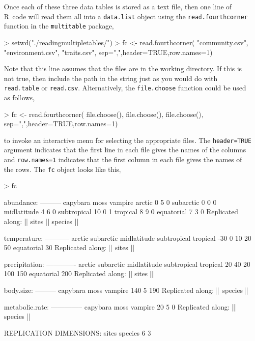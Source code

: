 \documentclass{article}
\newcommand{\R}{{\sf R}}
\newcommand{\code}[1]{\texttt{#1}}
\numberwithin{exercise}{section}
\begin{document}
Once each of these three data tables is stored as a text file, then one line of \R\ code will read them all into a \code{data.list} object using the \code{read.fourthcorner} function in the \code{multitable} package,
\begin{Schunk}
\begin{Sinput}
> setwd("./readingmultipletables/")
> fc <- read.fourthcorner(
   "community.csv",
   "environment.csv",
   "traits.csv",
   sep=",",header=TRUE,row.names=1)
\end{Sinput}
\end{Schunk}
Note that this line assumes that the files are in the working directory.  If this is not true, then include the path in the string just as you would do with \code{read.table} or \code{read.csv}.  Alternatively, the \code{file.choose} function could be used as follows,
\begin{Schunk}
\begin{Sinput}
> fc <- read.fourthcorner(
   file.choose(),
   file.choose(),
   file.choose(),
   sep=",",header=TRUE,row.names=1)
\end{Sinput}
\end{Schunk}
to invoke an interactive menu for selecting the appropriate files.  The \code{header=TRUE} argument indicates that the first line in each file gives the names of the columns and \code{row.names=1} indicates that the first column in each file gives the names of the rows.  The \code{fc} object looks like this,
\begin{Schunk}
\begin{Sinput}
> fc
\end{Sinput}
\begin{Soutput}
abundance:
---------
            capybara moss vampire
arctic             0    5       0
subarctic          0    0       0
midlatitude        4    6       0
subtropical       10    0       1
tropical           8    9       0
equatorial         7    3       0
Replicated along:  || sites || species || 


temperature:
-----------
     arctic   subarctic midlatitude subtropical    tropical 
        -30           0          10          20          50 
 equatorial 
         30 
Replicated along:  || sites || 


precipitation:
-------------
     arctic   subarctic midlatitude subtropical    tropical 
         20          40          20         100         150 
 equatorial 
        200 
Replicated along:  || sites || 


body.size:
---------
capybara     moss  vampire 
     140        5      190 
Replicated along:  || species || 


metabolic.rate:
--------------
capybara     moss  vampire 
      20        5        0 
Replicated along:  || species || 


REPLICATION DIMENSIONS: 
  sites species 
      6       3 
\end{Soutput}
\end{Schunk}
\end{document}
